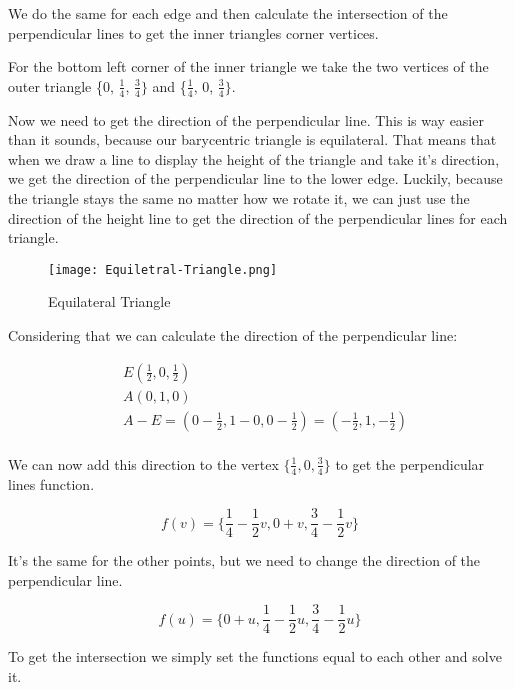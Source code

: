 \documentclass[12pt]{report} \usepackage{preamble}
\begin{document}
We do the same for each edge and then calculate the intersection of the
perpendicular lines to get the inner triangles corner vertices.

For the bottom left corner of the inner triangle we take the
two vertices of the outer triangle \{0, \(\frac{1}{4}\), \(\frac{3}{4}\}\)
and \{\(\frac{1}{4}\), 0, \(\frac{3}{4}\}\).

Now we need to get the direction of the perpendicular line.
This is way easier than it sounds, because our barycentric triangle is equilateral.
That means that when we draw a line to display the height of the triangle and take it's direction,
we get the direction of the perpendicular line to the lower edge.
Luckily, because the triangle stays the same no matter how we rotate it, we can just use
the direction of the height line to get the direction of the
perpendicular lines for each triangle. \cite{equilateral-triangle}

\begin{figure}[htbp]
	\centering \texttt{[image: Equiletral-Triangle.png]}
	\caption{Equilateral Triangle}
	\cite{equilateral-triangle}
\end{figure} \FloatBarrier

Considering that we can calculate the direction of the perpendicular line:

\[
	\begin{aligned}
		 & E(\frac{1}{2}, 0, \frac{1}{2})                                                      \\
		 & A(0, 1, 0)                                                                          \\
		 & A - E = (0 - \frac{1}{2}, 1 - 0, 0 - \frac{1}{2}) = (-\frac{1}{2}, 1, -\frac{1}{2}) \\
	\end{aligned}
\]

We can now add this direction to the vertex \(\{\frac{1}{4}, 0, \frac{3}{4}\}\)
to get the perpendicular lines function.

\[
	f(v) = \{\frac{1}{4} - \frac{1}{2}v, 0 + v, \frac{3}{4} - \frac{1}{2}v\}
\]

It's the same for the other points, but we need to change the direction of the perpendicular line.

\[
	f(u) = \{0+u, \frac{1}{4} - \frac{1}{2}u, \frac{3}{4} - \frac{1}{2}u\}
\]

To get the intersection we simply set the functions equal to each other and solve it.
\end{document}
